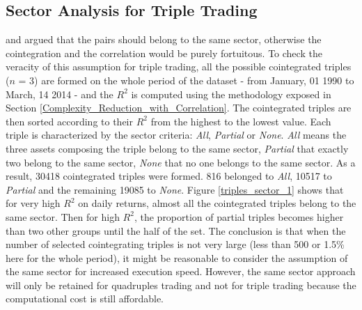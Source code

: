\documentclass[11pt,a4,twosided,singlespacing,titlepagenumber=on]{scrreprt}
\numberwithin{equation}{chapter} %
\theoremstyle{remark}
\begin{document}
\subsection{Sector Analysis for Triple Trading}
\cite{chan2009} and \cite{dunis2010} argued that the pairs should belong to the same sector, otherwise the cointegration and the correlation would be purely fortuitous. To check the veracity of this assumption for triple trading, all the possible cointegrated triples ($n$ = 3) are formed on the whole period of the dataset  - from January, 01 1990 to March, 14 2014 - and the $R^2$ is computed using the methodology exposed in Section \ref{Complexity_Reduction_with_Correlation}. The cointegrated triples are then sorted according to their $R^2$ from the highest to the lowest value. Each triple is characterized by the sector criteria: \textit{All}, \textit{Partial} or \textit{None}. \textit{All} means the three assets composing the triple belong to the same sector, \textit{Partial} that exactly two belong to the same sector, \textit{None} that no one belongs to the same sector. As a result, 30418 cointegrated triples were formed. 816 belonged to \textit{All}, 10517 to \textit{Partial} and the remaining 19085 to \textit{None}. Figure \ref{triples_sector_1} shows that for very high $R^2$ on daily returns, almost all the cointegrated triples belong to the same sector. Then for high $R^2$, the proportion of partial triples becomes higher than two other groups until the half of the set. The conclusion is that when the number of selected cointegrating triples is not very large (less than 500 or 1.5\% here for the whole period), it might be reasonable to consider the assumption of the same sector for increased execution speed. However, the same sector approach will only be retained for quadruples trading and not for triple trading because the computational cost is still affordable.
\end{document}
